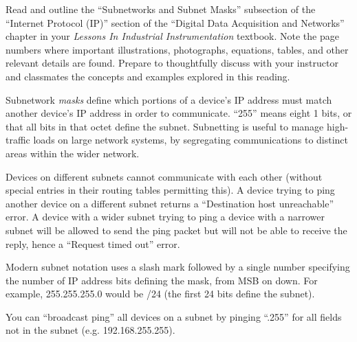 

Read and outline the ``Subnetworks and Subnet Masks'' subsection of the ``Internet Protocol (IP)'' section of the ``Digital Data Acquisition and Networks'' chapter in your {\it Lessons In Industrial Instrumentation} textbook.  Note the page numbers where important illustrations, photographs, equations, tables, and other relevant details are found.  Prepare to thoughtfully discuss with your instructor and classmates the concepts and examples explored in this reading.














Subnetwork {\it masks} define which portions of a device's IP address must match another device's IP address in order to communicate.  ``255'' means eight 1 bits, or that all bits in that octet define the subnet.  Subnetting is useful to manage high-traffic loads on large network systems, by segregating communications to distinct areas within the wider network.

\vskip 10pt

Devices on different subnets cannot communicate with each other (without special entries in their routing tables permitting this).  A device trying to ping another device on a different subnet returns a ``Destination host unreachable'' error.  A device with a wider subnet trying to ping a device with a narrower subnet will be allowed to send the ping packet but will not be able to receive the reply, hence a ``Request timed out'' error.

\vskip 10pt

Modern subnet notation uses a slash mark followed by a single number specifying the number of IP address bits defining the mask, from MSB on down.  For example, 255.255.255.0 would be /24 (the first 24 bits define the subnet).

\vskip 10pt

You can ``broadcast ping'' all devices on a subnet by pinging ``.255'' for all fields not in the subnet (e.g. 192.168.255.255).







